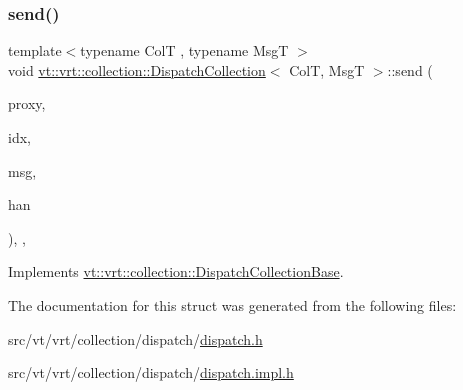 \subsubsection{\texorpdfstring{send()}{send()}}
{\footnotesize\ttfamily template$<$typename ColT , typename MsgT $>$ \\
void \hyperlink{structvt_1_1vrt_1_1collection_1_1_dispatch_collection}{vt\+::vrt\+::collection\+::\+Dispatch\+Collection}$<$ ColT, MsgT $>$\+::send (\begin{DoxyParamCaption}\item[{\hyperlink{namespacevt_a1b417dd5d684f045bb58a0ede70045ac}{Virtual\+Proxy\+Type}}]{proxy,  }\item[{void $\ast$}]{idx,  }\item[{void $\ast$}]{msg,  }\item[{\hyperlink{namespacevt_af64846b57dfcaf104da3ef6967917573}{Handler\+Type}}]{han }\end{DoxyParamCaption})\hspace{0.3cm}{\ttfamily [override]}, {\ttfamily [private]}, {\ttfamily [virtual]}}



Implements \hyperlink{structvt_1_1vrt_1_1collection_1_1_dispatch_collection_base_a7e409e791d9eafb8fea0f4f7d97ad860}{vt\+::vrt\+::collection\+::\+Dispatch\+Collection\+Base}.



The documentation for this struct was generated from the following files\+:\begin{DoxyCompactItemize}
\item 
src/vt/vrt/collection/dispatch/\hyperlink{src_2vt_2vrt_2collection_2dispatch_2dispatch_8h}{dispatch.\+h}\item 
src/vt/vrt/collection/dispatch/\hyperlink{src_2vt_2vrt_2collection_2dispatch_2dispatch_8impl_8h}{dispatch.\+impl.\+h}\end{DoxyCompactItemize}

